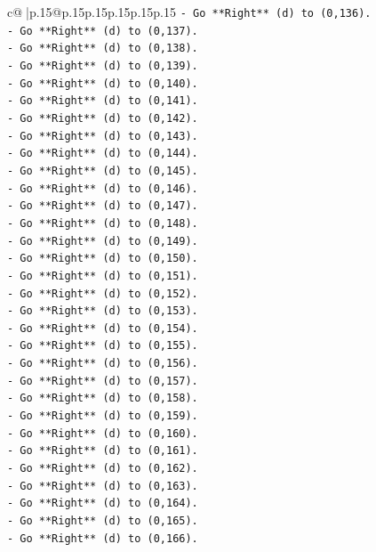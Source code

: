 \documentclass{article}
\begin{document}
{\begin{supertabular}{c@{$\;$}|p{.15\linewidth}@{}p{.15\linewidth}p{.15\linewidth}p{.15\linewidth}p{.15\linewidth}p{.15\linewidth}}
{{{\texttt{{-} Go **Right** (d) to (0,136).} \\
\texttt{{-} Go **Right** (d) to (0,137).} \\
\texttt{{-} Go **Right** (d) to (0,138).} \\
\texttt{{-} Go **Right** (d) to (0,139).} \\
\texttt{{-} Go **Right** (d) to (0,140).} \\
\texttt{{-} Go **Right** (d) to (0,141).} \\
\texttt{{-} Go **Right** (d) to (0,142).} \\
\texttt{{-} Go **Right** (d) to (0,143).} \\
\texttt{{-} Go **Right** (d) to (0,144).} \\
\texttt{{-} Go **Right** (d) to (0,145).} \\
\texttt{{-} Go **Right** (d) to (0,146).} \\
\texttt{{-} Go **Right** (d) to (0,147).} \\
\texttt{{-} Go **Right** (d) to (0,148).} \\
\texttt{{-} Go **Right** (d) to (0,149).} \\
\texttt{{-} Go **Right** (d) to (0,150).} \\
\texttt{{-} Go **Right** (d) to (0,151).} \\
\texttt{{-} Go **Right** (d) to (0,152).} \\
\texttt{{-} Go **Right** (d) to (0,153).} \\
\texttt{{-} Go **Right** (d) to (0,154).} \\
\texttt{{-} Go **Right** (d) to (0,155).} \\
\texttt{{-} Go **Right** (d) to (0,156).} \\
\texttt{{-} Go **Right** (d) to (0,157).} \\
\texttt{{-} Go **Right** (d) to (0,158).} \\
\texttt{{-} Go **Right** (d) to (0,159).} \\
\texttt{{-} Go **Right** (d) to (0,160).} \\
\texttt{{-} Go **Right** (d) to (0,161).} \\
\texttt{{-} Go **Right** (d) to (0,162).} \\
\texttt{{-} Go **Right** (d) to (0,163).} \\
\texttt{{-} Go **Right** (d) to (0,164).} \\
\texttt{{-} Go **Right** (d) to (0,165).} \\
\texttt{{-} Go **Right** (d) to (0,166).} \\
}}}
\end{supertabular}}
\end{document}
